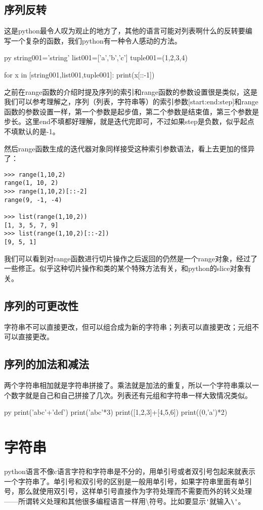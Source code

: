 \documentclass[12pt,oneside]{book}
\begin{document}
\begin{common-format}
\subsection{序列反转}
这是python最令人叹为观止的地方了，其他的语言可能对列表啊什么的反转要编写一个复杂的函数，我们python有一种令人感动的方法。

\begin{xverbatim}[129]{py}
string001='string'
list001=['a','b','c']
tuple001=(1,2,3,4)

for x in [string001,list001,tuple001]:
    print(x[::-1])
\end{xverbatim}


之前在range函数的介绍时提及序列的索引和range函数的参数设置很是类似，这是我们可以参考理解之，序列（列表，字符串等）的索引参数[start:end:step]和range函数的参数设置一样，第一个参数是起步值，第二个参数是结束值，第三个参数是步长。这里end不填都好理解，就是迭代完即可，不过如果step是负数，似乎起点不填默认的是-1。

然后range函数生成的迭代器对象同样接受这种索引参数语法，看上去更加的怪异了：
\begin{Verbatim}
>>> range(1,10,2)
range(1, 10, 2)
>>> range(1,10,2)[::-2]
range(9, -1, -4)

>>> list(range(1,10,2))
[1, 3, 5, 7, 9]
>>> list(range(1,10,2)[::-2])
[9, 5, 1]
\end{Verbatim}
我们可以看到对range函数进行切片操作之后返回的仍然是一个range对象，经过了一些修正。似乎这种切片操作和类的某个特殊方法有关，和python的slice对象有关。


\subsection{序列的可更改性}
字符串不可以直接更改，但可以组合成为新的字符串；列表可以直接更改；元组不可以直接更改。


\subsection{序列的加法和减法}
两个字符串相加就是字符串拼接了。乘法就是加法的重复，所以一个字符串乘以一个数字就是自己和自己拼接了几次。列表还有元组和字符串一样大致情况类似。

\begin{xverbatim}[129]{py}
print('abc'+'def')
print('abc'*3)
print([1,2,3]+[4,5,6])
print((0,'a')*2)
\end{xverbatim}


\section{字符串}
python语言不像c语言字符和字符串是不分的，用单引号或者双引号包起来就表示一个字符串了。单引号和双引号的区别是一般用单引号，如果字符串里面有单引号，那么就使用双引号，这样单引号直接作为字符处理而不需要而外的转义处理——所谓转义处理和其他很多编程语言一样用\textbackslash 符号。比如要显示\verb+'+就输入\verb+\'+。


\end{common-format}
\end{document}
